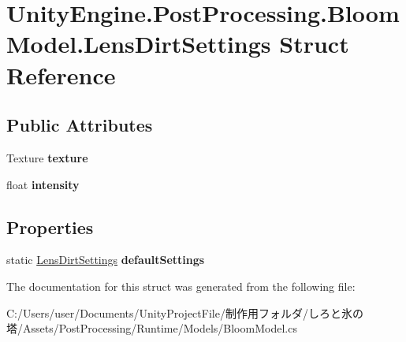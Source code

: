 \hypertarget{struct_unity_engine_1_1_post_processing_1_1_bloom_model_1_1_lens_dirt_settings}{}\section{Unity\+Engine.\+Post\+Processing.\+Bloom\+Model.\+Lens\+Dirt\+Settings Struct Reference}
\label{struct_unity_engine_1_1_post_processing_1_1_bloom_model_1_1_lens_dirt_settings}
\subsection*{Public Attributes}
\begin{DoxyCompactItemize}
\item 
\mbox{\label{struct_unity_engine_1_1_post_processing_1_1_bloom_model_1_1_lens_dirt_settings_a49f3c63b8474a37689597b9dda3bc026}} 
Texture {\bfseries texture}
\item 
\mbox{\label{struct_unity_engine_1_1_post_processing_1_1_bloom_model_1_1_lens_dirt_settings_abad6ccaf7daa6d25b6561005934f80c2}} 
float {\bfseries intensity}
\end{DoxyCompactItemize}
\subsection*{Properties}
\begin{DoxyCompactItemize}
\item 
\mbox{\label{struct_unity_engine_1_1_post_processing_1_1_bloom_model_1_1_lens_dirt_settings_ad206ec5b45a4c02bb502139d76e56a9c}} 
static \hyperlink{struct_unity_engine_1_1_post_processing_1_1_bloom_model_1_1_lens_dirt_settings}{Lens\+Dirt\+Settings} {\bfseries default\+Settings}
\end{DoxyCompactItemize}


The documentation for this struct was generated from the following file\+:\begin{DoxyCompactItemize}
\item 
C\+:/\+Users/user/\+Documents/\+Unity\+Project\+File/制作用フォルダ/しろと氷の塔/\+Assets/\+Post\+Processing/\+Runtime/\+Models/Bloom\+Model.\+cs\end{DoxyCompactItemize}

